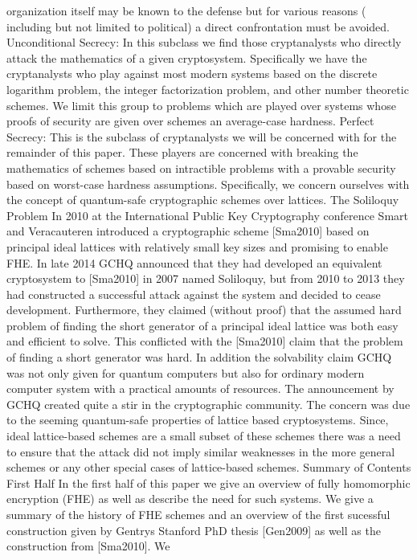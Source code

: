 organization itself may be known to the defense but for various reasons
( including but not limited to political) a direct confrontation must
be avoided. Unconditional Secrecy: In this subclass we find those
cryptanalysts who directly attack the mathematics of a given
cryptosystem. Specifically we have the cryptanalysts who play against
most modern systems based on the discrete logarithm problem, the
integer factorization problem, and other number theoretic schemes. We
limit this group to problems which are played over systems whose proofs
of security are given over schemes an average-case hardness. Perfect
Secrecy: This is the subclass of cryptanalysts we will be concerned
with for the remainder of this paper. These players are concerned with
breaking the mathematics of schemes based on intractible problems with
a provable security based on worst-case hardness assumptions.
Specifically, we concern ourselves with the concept of quantum-safe
cryptographic schemes over lattices. The Soliloquy Problem In 2010 at
the International Public Key Cryptography conference Smart and
Veracauteren introduced a cryptographic scheme [Sma2010] based on
principal ideal lattices with relatively small key sizes and promising
to enable FHE. In late 2014 GCHQ announced that they had developed an
equivalent cryptosystem to [Sma2010] in 2007 named Soliloquy, but from
2010 to 2013 they had constructed a successful attack against the
system and decided to cease development. Furthermore, they claimed
(without proof) that the assumed hard problem of finding the short
generator of a principal ideal lattice was both easy and efficient to
solve. This conflicted with the [Sma2010] claim that the problem of
finding a short generator was hard. In addition the solvability claim
GCHQ was not only given for quantum computers but also for ordinary
modern computer system with a practical amounts of resources. The
announcement by GCHQ created quite a stir in the cryptographic
community. The concern was due to the seeming quantum-safe properties
of lattice based cryptosystems. Since, ideal lattice-based schemes are
a small subset of these schemes there was a need to ensure that the
attack did not imply similar weaknesses in the more general schemes or
any other special cases of lattice-based schemes. Summary of Contents
First Half In the first half of this paper we give an overview of fully
homomorphic encryption (FHE) as well as describe the need for such
systems. We give a summary of the history of FHE schemes and an
overview of the first sucessful construction given by Gentrys Stanford
PhD thesis [Gen2009] as well as the construction from [Sma2010]. We
